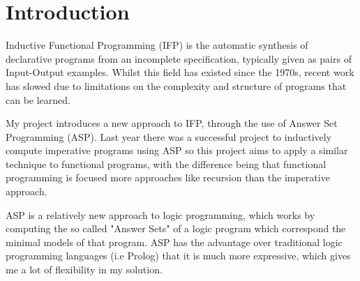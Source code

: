 \chapter{Introduction}

Inductive Functional Programming (IFP) is the automatic synthesis of declarative programs from an incomplete specification, typically given as pairs of Input-Output examples. Whilst this field has existed since the 1970s, recent work has slowed due to limitations on the complexity and structure of programs that can be learned.

My project introduces a new approach to IFP, through the use of Answer Set Programming (ASP). Last year there was a successful project to inductively compute imperative programs using ASP so this project aims to apply a similar technique to functional programs, with the difference being that functional programming is focused more approaches like recursion than the imperative approach. 

ASP is a relatively new approach to logic programming, which works by computing the so called "Answer Sets" of a logic program which correspond the minimal models of that program. ASP has the advantage over traditional logic programming languages (i.e Prolog) that it is much more expressive, which gives me a lot of flexibility in my solution.


\pagebreak
\renewcommand\bibname{{References}}

